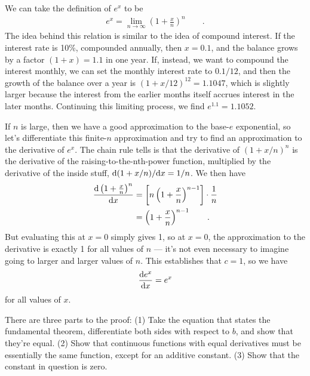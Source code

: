 We can take the definition of $e^x$ to be\label{definition-of-exp}
\begin{align*}
  e^x = \lim_{n\rightarrow \infty} \left(1+\frac{x}{n}\right)^n \qquad .
\end{align*}
The idea behind this relation is similar to the idea of compound interest. If the interest rate is 10\%, compounded
annually, then $x=0.1$, and the balance grows by a factor $(1+x)=1.1$ in one year. If, instead, we want to compound the
interest monthly, we can set the monthly interest rate to $0.1/12$, and then the growth of the
balance over a year is $(1+x/12)^{12}=1.1047$, which is slightly larger because the interest from the earlier months
itself accrues interest in the later months. Continuing this limiting process, we find $e^{1.1}=1.1052$.

If $n$ is large, then we have a good approximation to the base-$e$ exponential, so let's differentiate
this finite-$n$ approximation and try to find an approximation to the derivative of $e^x$. The chain rule
tells is that the derivative of $(1+x/n)^n$ is the derivative of the raising-to-the-nth-power function,
multiplied by the derivative of the inside stuff, $\textup{d}(1+x/n)/\textup{d} x=1/n$. We then have
\begin{align*}
  \frac{\textup{d} \left(1+\frac{x}{n}\right)^n}{\textup{d} x} &= \left[n\left(1+\frac{x}{n}\right)^{n-1}\right]\cdot \frac{1}{n} \\
            &= \left(1+\frac{x}{n}\right)^{n-1} \qquad .
\end{align*}
But evaluating this at $x=0$ simply gives 1, so at $x=0$, the approximation to the derivative is exactly 1 for all values of
$n$ --- it's not even necessary to imagine going to larger and larger values of $n$. This establishes that $c=1$,
so we have
\begin{equation*}
  \frac{\textup{d} e^x}{\textup{d} x} = e^x 
\end{equation*}
for all values of $x$.


There are three parts to the proof: (1)  Take the equation that states
the fundamental theorem, differentiate both sides with respect to $b$, and show that they're equal.
(2) Show that continuous functions with equal derivatives must be essentially the same function, except for an
additive constant. (3) Show that the constant in question is zero.

